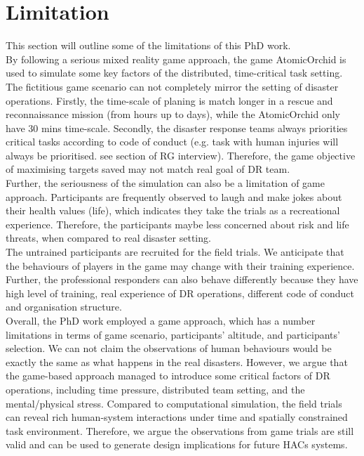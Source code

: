 


\section{Limitation}
This section will outline some of the limitations of this PhD work. \\

By following a serious mixed reality game approach, the game AtomicOrchid is used to simulate some key factors of the distributed, time-critical task setting.  The fictitious game scenario can not completely mirror the setting of disaster operations. Firstly, the time-scale of planing is match longer in a rescue and reconnaissance mission (from hours up to days), while the AtomicOrchid only have 30 mins time-scale. Secondly, the disaster response teams always priorities critical tasks according to code of conduct (e.g. task with human injuries will always be prioritised. see section of RG interview). Therefore, the game objective of maximising targets saved may not match real goal of DR team.  \\

Further, the seriousness of the simulation can also be a limitation of game approach. Participants are frequently observed to laugh and make jokes about their health values (life), which indicates they take the trials as a recreational experience. Therefore, the participants maybe less concerned about risk and life threats, when compared to real disaster setting. \\

The untrained participants are recruited for the field trials. We anticipate that the behaviours of players in the game may change with their training experience. Further, the professional responders can also behave differently because they have high level of training, real experience of DR operations, different code of conduct and organisation structure.\\

Overall, the PhD work employed a game approach, which has a number limitations in terms of game scenario, participants' altitude, and participants' selection.  We can not claim the observations of human behaviours would be exactly the same as what happens in the real disasters. However, we argue that the game-based approach managed to introduce some critical factors of DR operations, including time pressure, distributed team setting, and the mental/physical stress. Compared to computational simulation, the field trials can reveal rich human-system interactions under time and spatially constrained task environment. Therefore, we argue the observations from game trials are still valid and can be used to generate design implications for future HACs systems. 


